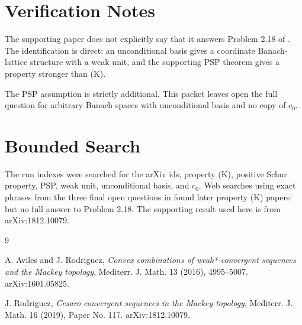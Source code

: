 \documentclass[11pt]{article}
\begin{document}
\section*{Verification Notes}

The supporting paper does not explicitly say that it answers Problem 2.18 of
\cite{AvilesRodriguez2016}. The identification is direct: an unconditional
basis gives a coordinate Banach-lattice structure with a weak unit, and the
supporting PSP theorem gives a property stronger than (K).

The PSP assumption is strictly additional. This packet leaves open the full
question for arbitrary Banach spaces with unconditional basis and no copy of
\(c_0\).

\section*{Bounded Search}

The run indexes were searched for the arXiv ids, property (K), positive Schur
property, PSP, weak unit, unconditional basis, and \(c_0\). Web searches using
exact phrases from the three final open questions in \cite{AvilesRodriguez2016}
found later property (K) papers but no full answer to Problem 2.18. The
supporting result used here is from arXiv:1812.10079.

\begin{thebibliography}{9}

A. Aviles and J. Rodriguez,
\emph{Convex combinations of weak*-convergent sequences and the Mackey
topology},
Mediterr. J. Math. 13 (2016), 4995--5007.
arXiv:1601.05825.

J. Rodriguez,
\emph{Cesaro convergent sequences in the Mackey topology},
Mediterr. J. Math. 16 (2019), Paper No. 117.
arXiv:1812.10079.

\end{thebibliography}
\end{document}
